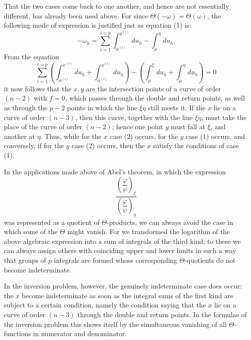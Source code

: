 \documentclass[10pt]{article}
\begin{document}
That the two cases come back to one another, and hence are not essentially different, has already been used above. For since \(\Theta(-\omega)=\Theta(\omega)\), the following mode of expression is justified just as equation (1) is:
\[
\tag{2}
-\omega_h=\sum_{i=1}^{i=p}\int_{\alpha^{(i)}}^{y^{(i)}}du_h-\int_{\mu}^{\eta}du_h .
\]
From the equation
\[
\sum_{i=1}^{i=p}\left(\int_{\alpha^{(i)}}^{x^{(i)}}du_h+
\int_{\alpha^{(i)}}^{y^{(i)}}du_h\right)-
\left(\int_{\mu}^{\xi}du_h+\int_{\mu}^{\eta}du_h\right)=0
\]
it now follows that the \(x,y\) are the intersection points of a curve of order \((n-2)\) with \(f=0\), which passes through the double and return points, as well as through the \(p-2\) points in which the line \(\xi\eta\) still meets it. If the \(x\) lie on a curve of order \((n-3)\), then this curve, together with the line \(\xi\eta\), must take the place of the curve of order \((n-2)\); hence one point \(y\) must fall at \(\xi\), and another at \(\eta\). Thus, while for the \(x\) case (2) occurs, for the \(y\) case (1) occurs, and conversely, if for the \(y\) case (2) occurs, then the \(x\) satisfy the conditions of case (1).

In the applications made above of Abel's theorem, in which the expression
\[
\frac{\left(\dfrac{\varphi}{\psi}\right)_{\xi}}
     {\left(\dfrac{\varphi}{\psi}\right)_{\eta}}
\]
was represented as a quotient of \(\Theta\)-products, we can always avoid the case in which some of the \(\Theta\) might vanish. For we transformed the logarithm of the above algebraic expression into a sum of integrals of the third kind; to these we can always assign others with coinciding upper and lower limits in such a way that groups of \(p\) integrals are formed whose corresponding \(\Theta\)-quotients do not become indeterminate.

In the inversion problem, however, the genuinely indeterminate case does occur: the \(x\) become indeterminate as soon as the integral sums of the first kind are subject to a certain condition, namely the condition saying that the \(x\) lie on a curve of order \((n-3)\) through the double and return points. In the formulae of the inversion problem this shows itself by the simultaneous vanishing of all \(\Theta\)-functions in numerator and denominator.
\end{document}
